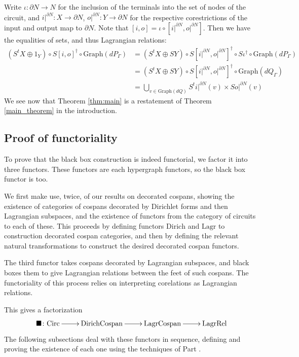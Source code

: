 Write $\iota: \partial N \to N$ for the inclusion of the terminals into the set
of nodes of the circuit, and $i\rvert^{\partial N}: X \to \partial N$,
$o\rvert^{\partial N}: Y \to \partial N$ for the respective corestrictions of
the input and output map to $\partial N$. Note that $[i,o] = \iota \circ
[i\rvert^{\partial N}, o\rvert^{\partial N}]$.
Then we have the equalities of sets, and thus Lagrangian relations:
\begin{align*}
  (S^t\!X\oplus 1_Y) \circ S[i,o]^\dagger \circ \mathrm{Graph}(dP_\Gamma)
  &= (S^t\!X\oplus SY) \circ S[i\rvert^{\partial
  N},o\rvert^{\partial N}]^\dagger \circ S\iota^\dagger \circ \mathrm{Graph}(dP_\Gamma) \\
  &= (S^t\!X\oplus SY) \circ S[i\rvert^{\partial
  N},o\rvert^{\partial N}]^\dagger \circ \mathrm{Graph}(dQ_\Gamma) \\
  &= \bigcup_{v \in \mathrm{Graph}(dQ)} S^ti\rvert^{\partial N}(v) \times
  So\rvert^{\partial N}(v)
\end{align*}
We see now that Theorem \ref{thm:main} is a restatement of Theorem
\ref{main_theorem} in the introduction.

\subsection{Proof of functoriality} \label{sec:proof}
To prove that the black box construction is indeed functorial, we
factor it into three functors. These functors are each hypergraph
functors, so the black box functor is too.

We first make use, twice, of our results on decorated cospans, showing the
existence of categories of cospans decorated by Dirichlet forms and then
Lagrangian subspaces, and the existence of functors from the category of
circuits to each of these. This proceeds by defining functors $\mathrm{Dirich}$
and $\mathrm{Lagr}$ to construction decorated cospan categories, and then by
defining the relevant natural transformations to construct the desired decorated
cospan functors.

The third functor takes cospans decorated by Lagrangian subspaces, and black
boxes them to give Lagrangian relations between the feet of such cospans. The
functoriality of this process relies on interpreting corelations as Lagrangian
relations.

This gives a factorization
\[
  \xymatrix{
    \blacksquare\maps \Circ \ar[r] & \mathrm{DirichCospan} \ar[r] &
    \mathrm{LagrCospan} \ar[r] & \LagrRel
  }
\]
The following subsections deal with these functors in sequence, defining and
proving the existence of each one using the techniques of Part
.

